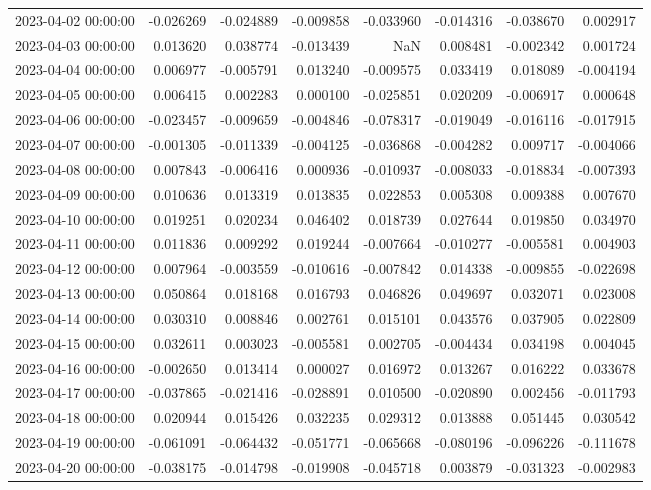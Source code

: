 \begin{tabular}{lrrrrrrr}
2023-04-02 00:00:00 & -0.026269 & -0.024889 & -0.009858 & -0.033960 & -0.014316 & -0.038670 & 0.002917 \\
2023-04-03 00:00:00 & 0.013620 & 0.038774 & -0.013439 & NaN & 0.008481 & -0.002342 & 0.001724 \\
2023-04-04 00:00:00 & 0.006977 & -0.005791 & 0.013240 & -0.009575 & 0.033419 & 0.018089 & -0.004194 \\
2023-04-05 00:00:00 & 0.006415 & 0.002283 & 0.000100 & -0.025851 & 0.020209 & -0.006917 & 0.000648 \\
2023-04-06 00:00:00 & -0.023457 & -0.009659 & -0.004846 & -0.078317 & -0.019049 & -0.016116 & -0.017915 \\
2023-04-07 00:00:00 & -0.001305 & -0.011339 & -0.004125 & -0.036868 & -0.004282 & 0.009717 & -0.004066 \\
2023-04-08 00:00:00 & 0.007843 & -0.006416 & 0.000936 & -0.010937 & -0.008033 & -0.018834 & -0.007393 \\
2023-04-09 00:00:00 & 0.010636 & 0.013319 & 0.013835 & 0.022853 & 0.005308 & 0.009388 & 0.007670 \\
2023-04-10 00:00:00 & 0.019251 & 0.020234 & 0.046402 & 0.018739 & 0.027644 & 0.019850 & 0.034970 \\
2023-04-11 00:00:00 & 0.011836 & 0.009292 & 0.019244 & -0.007664 & -0.010277 & -0.005581 & 0.004903 \\
2023-04-12 00:00:00 & 0.007964 & -0.003559 & -0.010616 & -0.007842 & 0.014338 & -0.009855 & -0.022698 \\
2023-04-13 00:00:00 & 0.050864 & 0.018168 & 0.016793 & 0.046826 & 0.049697 & 0.032071 & 0.023008 \\
2023-04-14 00:00:00 & 0.030310 & 0.008846 & 0.002761 & 0.015101 & 0.043576 & 0.037905 & 0.022809 \\
2023-04-15 00:00:00 & 0.032611 & 0.003023 & -0.005581 & 0.002705 & -0.004434 & 0.034198 & 0.004045 \\
2023-04-16 00:00:00 & -0.002650 & 0.013414 & 0.000027 & 0.016972 & 0.013267 & 0.016222 & 0.033678 \\
2023-04-17 00:00:00 & -0.037865 & -0.021416 & -0.028891 & 0.010500 & -0.020890 & 0.002456 & -0.011793 \\
2023-04-18 00:00:00 & 0.020944 & 0.015426 & 0.032235 & 0.029312 & 0.013888 & 0.051445 & 0.030542 \\
2023-04-19 00:00:00 & -0.061091 & -0.064432 & -0.051771 & -0.065668 & -0.080196 & -0.096226 & -0.111678 \\
2023-04-20 00:00:00 & -0.038175 & -0.014798 & -0.019908 & -0.045718 & 0.003879 & -0.031323 & -0.002983 \\

\end{tabular}
